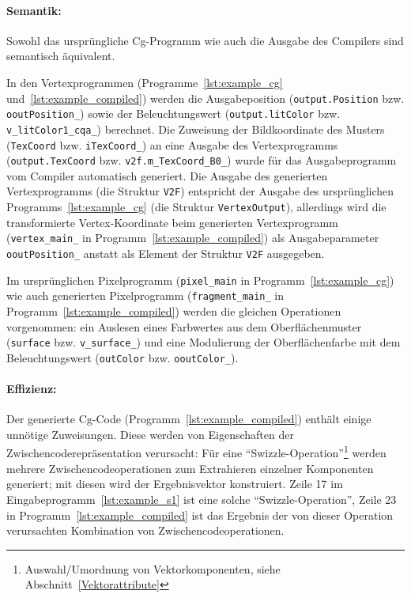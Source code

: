 \documentclass[twoside,a4paper,fleqn,12pt]{book}
\begin{document}
\paragraph{Semantik:} Sowohl das ursprüngliche Cg-Programm wie auch die Ausgabe des Compilers sind semantisch
äquivalent.

In den Vertexprogrammen (Programme~\ref{lst:example_cg} und~\ref{lst:example_compiled}) werden die Ausgabeposition (\verb+output.Position+ bzw. \verb+ooutPosition_+) sowie 
der Beleuchtungswert (\verb+output.litColor+ bzw. \verb+v_litColor1_cqa_+) berechnet. Die Zuweisung der Bildkoordinate des Musters
(\verb+TexCoord+ bzw. \verb+iTexCoord_+) an eine Ausgabe des Vertexprogramms (\verb+output.TexCoord+ bzw. \verb+v2f.m_TexCoord_B0_+)
wurde für das Ausgabeprogramm vom Compiler automatisch generiert. Die Ausgabe des generierten Vertexprogramms (die Struktur \verb+V2F+)
entspricht der Ausgabe des ursprünglichen Programms~\ref{lst:example_cg} (die Struktur \verb+VertexOutput+), allerdings wird die transformierte
Vertex-Koordinate beim generierten Vertexprogramm (\verb+vertex_main_+ in Programm~\ref{lst:example_compiled}) als Ausgabeparameter \verb+ooutPosition_+ anstatt als
Element der Struktur \verb+V2F+ ausgegeben.

Im ursprünglichen Pixelprogramm (\verb+pixel_main+ in Programm~\ref{lst:example_cg}) 
wie auch generierten Pixelprogramm (\verb+fragment_main_+ in Programm~\ref{lst:example_compiled}) werden die gleichen Operationen vorgenommen:
ein Auslesen eines Farbwertes aus dem Oberflächenmuster (\verb+surface+ bzw. \verb+v_surface_+)
und eine Modulierung der Oberflächenfarbe mit dem Beleuchtungswert (\verb+outColor+ bzw. \verb+ooutColor_+).

\paragraph{Effizienz:} Der generierte Cg-Code (Programm~\ref{lst:example_compiled}) enthält einige unnötige Zuweisungen.
Diese werden von Eigenschaften der Zwischencoderepräsentation verursacht:
Für eine ``Swizzle-Operation''\footnote{Auswahl/Umordnung von Vektorkomponenten, siehe Abschnitt~\ref{Vektorattribute}}
werden mehrere Zwischencodeoperationen zum Extrahieren einzelner Komponenten generiert; mit diesen wird der Ergebnisvektor
konstruiert. Zeile 17 im Eingabeprogramm~\ref{lst:example_s1} ist eine solche ``Swizzle-Operation'',
Zeile 23 in Programm~\ref{lst:example_compiled} ist das Ergebnis der von dieser Operation verursachten Kombination von Zwischencodeoperationen.
\end{document}
